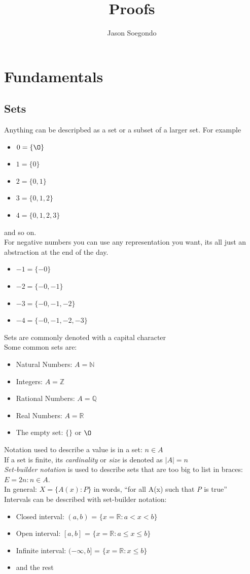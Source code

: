 \documentclass[a4paper,11pt]{article}
\title{Proofs}
\author{Jason Soegondo}
\date{}
\begin{document}
\maketitle
\tableofcontents

\section{Fundamentals}
\subsection{Sets}
Anything can be descripbed as a set or a subset of a larger set.
For example
\begin{itemize}
  \item $0 = \{\O\}$
  \item $1 = \{0\}$
  \item $2 = \{0, 1\}$
  \item $3 = \{0,1,2\}$
  \item $4 = \{0,1,2,3\}$
\end{itemize}
and so on.\medskip\\
For negative numbers you can use any representation you want, its all just an abstraction at the end of the day.
\begin{itemize}
 \item $-1 = \{-0\}$
 \item $-2 = \{-0, -1\}$
 \item $-3 = \{-0, -1, -2\}$
 \item $-4 = \{-0, -1, -2, -3\}$
\end{itemize}
Sets are commonly denoted with a capital character\\
Some common sets are:
\begin{itemize}
 \item{Natural Numbers: $A=\mathbb N$}
 \item{Integers: $A=\mathbb Z$}
 \item{Rational Numbers: $A=\mathbb Q$}
 \item{Real Numbers: $A=\mathbb R$}
 \item{The empty set: $\{\}$ or $\O$}
\end{itemize}
Notation used to describe a value is in a set: $n \in A$\\
If a set is finite, its \textit{cardinality} or \textit{size} is denoted as $|A| = n$\\
\textit{Set-builder notation} is used to describe sets that are too big to list in braces: $E={2n:n \in A}$.\\
In general: $X=\{A(x):P\}$ in words, ``for all A(x) such that \textit{P} is true''\\
Intervals can be described with set-builder notation:
\begin{itemize}
 \item Closed interval: $(a, b)$ = $\{x=\mathbb R:a < x < b\}$
 \item Open interval: $[a, b]$ = $\{x=\mathbb R:a \leq x \leq b\}$
 \item Infinite interval: $(-\infty, b]$ = $\{x=\mathbb R:x \leq b\}$
 \item and the rest
\end{itemize}
\end{document}

